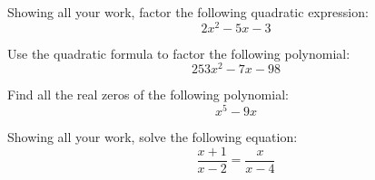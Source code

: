 \documentclass[11pt,letterpaper]{article}
\begin{document}

 Showing all your work, factor the following quadratic expression:
	\[
	2x^2 - 5x - 3
	\]



\newpage



 Use the quadratic formula to factor the following polynomial:
	\[
	253x^2 - 7x - 98
	\]



\newpage



 Find all the real zeros of the following polynomial:
	\[
	x^5 - 9x
	\]



\newpage



 Showing all your work, solve the following equation:
	\[
	\dfrac{x + 1}{x - 2}= \dfrac{x}{x - 4}
	\]
\end{document}
